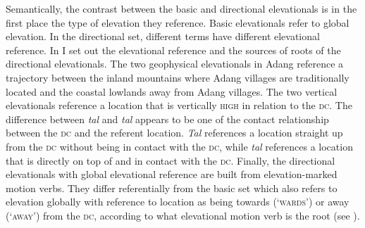 Semantically, the contrast between the basic and directional elevationals is in the first place the type of elevation they reference. Basic elevationals refer to global elevation. In the directional set, different terms have different elevational reference. In  I set out the elevational reference and the sources of roots of the directional elevationals. The two geophysical elevationals in Adang reference a trajectory between the inland mountains where Adang villages are traditionally located and the coastal lowlands away from Adang villages. The two vertical elevationals reference a location that is vertically \textsc{high} in relation to the \textsc{dc}. The difference between \textit{ta}\textit{{\textglotstop}}\textit{l}\textit{{\textepsilon}} and \textit{tal}\textit{{\textepsilon}} appears to be one of the contact relationship between the \textsc{dc} and the referent location. \textit{Ta}\textit{{\textglotstop}}\textit{l}\textit{{\textepsilon}} references a location straight up from the \textsc{dc} without being in contact with the \textsc{dc}, while \textit{tal}\textit{{\textepsilon}} references a location that is directly on top of and in contact with the \textsc{dc}. Finally, the directional elevationals with global elevational reference are built from elevation-marked motion verbs. They differ referentially from the basic set which also refers to elevation globally with reference to location as being towards (`\textsc{wards}') or away (`\textsc{away}') from the \textsc{dc}, according to what elevational motion verb is the root (see ).  


